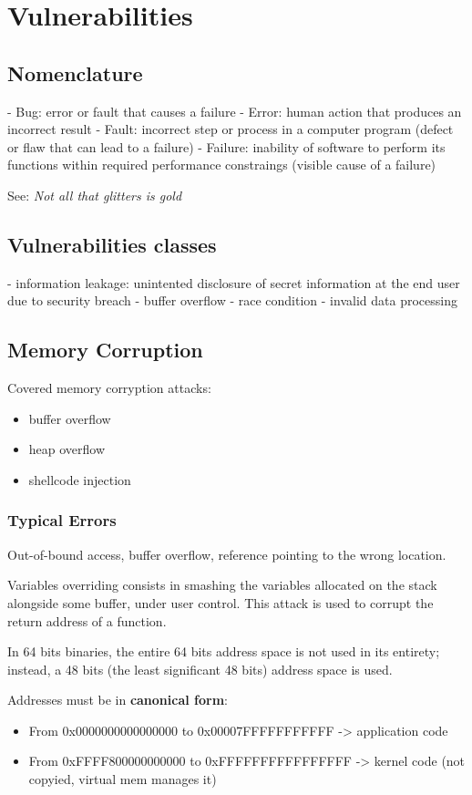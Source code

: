 \chapter{Vulnerabilities}
\section{Nomenclature}
 - Bug: error or fault that causes a failure
 - Error: human action that produces an incorrect result
 - Fault: incorrect step or process in a computer program (defect or flaw that can lead to a failure)
 - Failure: inability of software to perform its functions within required performance constraings (visible cause of a failure)

See: \textit{Not all that glitters is gold}

\section{Vulnerabilities classes}
 - information leakage: unintented disclosure of secret information at the end user due to security breach
 - buffer overflow
 - race condition
 - invalid data processing

\section{Memory Corruption}
Covered memory corryption attacks:
\begin{itemize}
  \item buffer overflow
  \item heap overflow
  \item shellcode injection
\end{itemize}

\subsection{Typical Errors}
Out-of-bound access, buffer overflow, reference pointing to the wrong location.

Variables overriding consists in smashing the variables allocated on the stack alongside some buffer, under user control.
This attack is used to corrupt the return address of a function.

In 64 bits binaries, the entire 64 bits address space is not used in its entirety; instead, a 48 bits (the least significant 48 bits) address space is used.

Addresses must be in \textbf{canonical form}:
\begin{itemize}
  \item From 0x0000000000000000 to 0x00007FFFFFFFFFFF -> application code
  \item From 0xFFFF800000000000 to 0xFFFFFFFFFFFFFFFF -> kernel code (not copyied, virtual mem manages it)
\end{itemize}

